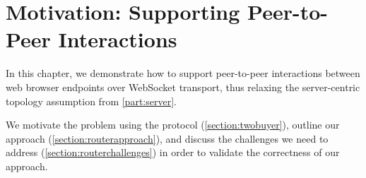 \chapter{Motivation: Supporting Peer-to-Peer Interactions}
\label{chap:p2p}

In this chapter,
we demonstrate how to support peer-to-peer interactions
between web browser endpoints over WebSocket transport,
thus relaxing the server-centric topology assumption from 
\cref{part:server}.

We motivate the problem using the 
 protocol (\cref{section:twobuyer}),
outline our approach (\cref{section:routerapproach}),
and discuss the challenges we need to address 
(\cref{section:routerchallenges}) in order to validate the
correctness of our approach.





